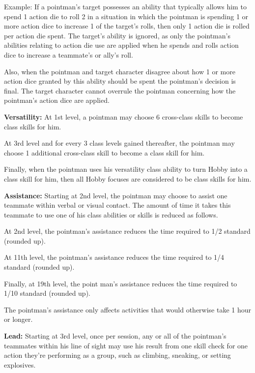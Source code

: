 Example: If a pointman's target possesses an ability that typically allows him to spend 1 action die to roll 2 in a situation in which the pointman is spending 1 or more action dice to increase 1 of the target's rolls, then only 1 action die is rolled per action die spent. The target's ability is ignored, as only the pointman's abilities relating to action die use are applied when he spends and rolls action dice to increase a teammate's or ally's roll.

Also, when the pointman and target character disagree about how 1 or more action dice granted by this ability should be spent the pointman's decision is final. The target character cannot overrule the pointman concerning how the pointman's action dice are applied.

\vspace*{5pt}

\textbf{Versatility:} At 1st level, a pointman may choose 6 cross-class skills to become class skills for him.

At 3rd level and for every 3 class levels gained thereafter, the pointman may choose 1 additional cross-class skill to become a class skill for him.

Finally, when the pointman uses his versatility class ability to turn Hobby into a class skill for him, then all Hobby focuses are considered to be class skills for him.

\textbf{Assistance:} Starting at 2nd level, the pointman may choose to assist one teammate within verbal or visual contact. The amount of time it takes this teammate to use one of his class abilities or skills is reduced as follows.

At 2nd level, the pointman's assistance reduces the time required to 1/2 standard (rounded up).

At 11th level, the pointman's assistance reduces the time required to 1/4 standard (rounded up).

Finally, at 19th level, the point man's assistance reduces the time required to 1/10 standard (rounded up).

The pointman's assistance only affects activities that would otherwise take 1 hour or longer.

\textbf{Lead:} Starting at 3rd level, once per session, any or all of the pointman's teammates within his line of sight may use his result from one skill check for one action they're performing as a group, such as climbing, sneaking, or setting explosives.

